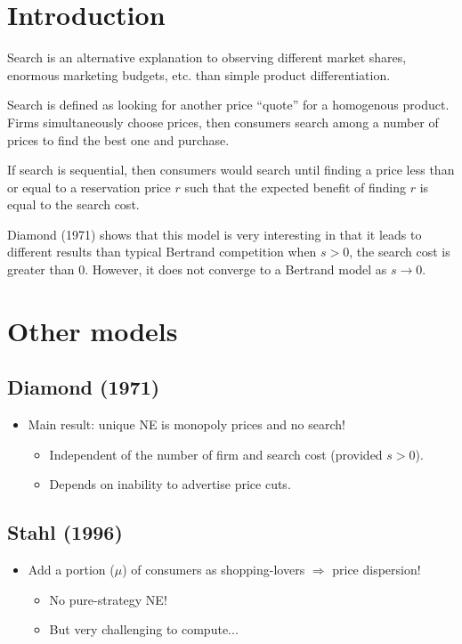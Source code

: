 \section{Introduction}

Search is an alternative explanation to observing different market shares, enormous marketing budgets, etc. than simple product differentiation.

Search is defined as looking for another price ``quote'' for a homogenous product. Firms simultaneously choose prices, then consumers search among a number of prices to find the best one and purchase.

If search is sequential, then consumers would search until finding a price less than or equal to a reservation price $r$ such that the expected benefit of finding $r$ is equal to the search cost.

Diamond (1971) shows that this model is very interesting in that it leads to different results than typical Bertrand competition when $s>0$, the search cost is greater than 0. However, it does not converge to a Bertrand model as $s\to 0$.

\section{Other models}

\subsection{Diamond (1971)}

\begin{itemize}
\item Main result: unique NE is monopoly prices and no search!
\begin{itemize}
\item Independent of the number of firm and search cost (provided $s>0$).
\item Depends on inability to advertise price cuts.
\end{itemize}
\end{itemize}

\subsection{Stahl (1996)}

\begin{itemize}
\item Add a portion ($\mu$) of consumers as shopping-lovers $\Rightarrow$ price dispersion!
\begin{itemize}
\item No pure-strategy NE!
\item But very challenging to compute...
\end{itemize}
\end{itemize}

